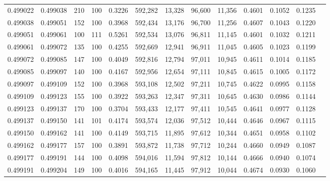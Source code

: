 \begin{tabular}{rrrrrrrrrrrrr}
0.499022 & 0.499038 &   210 & 100 &                                     0.3226 & 592,282 &  13,328 &  96,600 &  11,356 & 0.4601 & 0.1052 & 0.1235 \\
0.499038 & 0.499051 &   152 & 100 &                                     0.3968 & 592,434 &  13,176 &  96,700 &  11,256 & 0.4607 & 0.1043 & 0.1220 \\
0.499051 & 0.499061 &   100 & 111 &                                     0.5261 & 592,534 &  13,076 &  96,811 &  11,145 & 0.4601 & 0.1032 & 0.1211 \\
0.499061 & 0.499072 &   135 & 100 &                                     0.4255 & 592,669 &  12,941 &  96,911 &  11,045 & 0.4605 & 0.1023 & 0.1199 \\
0.499072 & 0.499085 &   147 & 100 &                                     0.4049 & 592,816 &  12,794 &  97,011 &  10,945 & 0.4611 & 0.1014 & 0.1185 \\
0.499085 & 0.499097 &   140 & 100 &                                     0.4167 & 592,956 &  12,654 &  97,111 &  10,845 & 0.4615 & 0.1005 & 0.1172 \\
0.499097 & 0.499109 &   152 & 100 &                                     0.3968 & 593,108 &  12,502 &  97,211 &  10,745 & 0.4622 & 0.0995 & 0.1158 \\
0.499109 & 0.499123 &   155 & 100 &                                     0.3922 & 593,263 &  12,347 &  97,311 &  10,645 & 0.4630 & 0.0986 & 0.1144 \\
0.499123 & 0.499137 &   170 & 100 &                                     0.3704 & 593,433 &  12,177 &  97,411 &  10,545 & 0.4641 & 0.0977 & 0.1128 \\
0.499137 & 0.499150 &   141 & 101 &                                     0.4174 & 593,574 &  12,036 &  97,512 &  10,444 & 0.4646 & 0.0967 & 0.1115 \\
0.499150 & 0.499162 &   141 & 100 &                                     0.4149 & 593,715 &  11,895 &  97,612 &  10,344 & 0.4651 & 0.0958 & 0.1102 \\
0.499162 & 0.499177 &   157 & 100 &                                     0.3891 & 593,872 &  11,738 &  97,712 &  10,244 & 0.4660 & 0.0949 & 0.1087 \\
0.499177 & 0.499191 &   144 & 100 &                                     0.4098 & 594,016 &  11,594 &  97,812 &  10,144 & 0.4666 & 0.0940 & 0.1074 \\
0.499191 & 0.499204 &   149 & 100 &                                     0.4016 & 594,165 &  11,445 &  97,912 &  10,044 & 0.4674 & 0.0930 & 0.1060 \\

\end{tabular}
